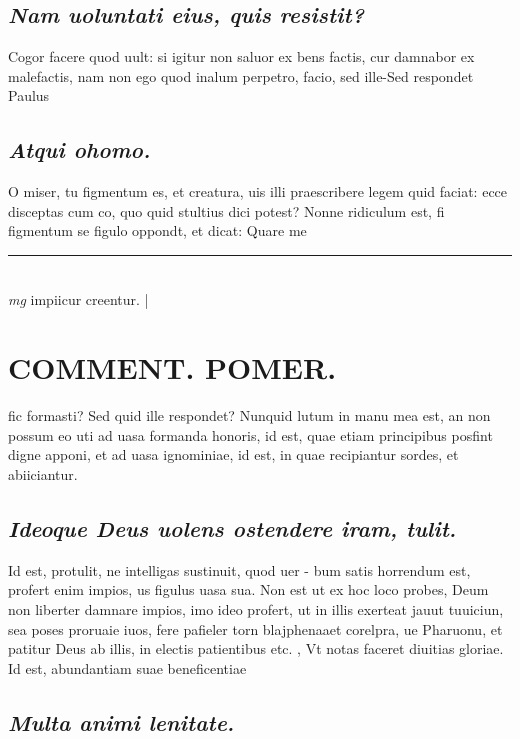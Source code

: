 \documentclass{article}
\begin{document}
\begin{pages}
\subsection*{\textit{Nam uoluntati eius, quis resistit? }}\pstart Cogor facere quod uult: si igitur non saluor ex bens factis, cur damnabor ex malefactis, nam non ego quod inalum perpetro, facio, sed ille-Sed respondet Paulus  \pend
{}
{}
\subsection*{\textit{Atqui ohomo. }}\pstart O miser, tu figmentum es, et creatura, uis illi praescribere legem quid faciat: ecce disceptas cum co, quo quid stultius dici potest? Nonne ridiculum est, fi figmentum se figulo oppondt, et dicat: Quare me  \pend
\vspace{0.5cm}\noindent
\vspace{0.2cm}\rule{1cm}{0.2pt}\\ 
\hspace{0.2cm}\textit{mg}
\footnotesize impiicur creentur.  
\normalsize| 
\section*{COMMENT. POMER.  }\pstart fic formasti? Sed quid ille respondet? Nunquid lutum in manu mea est, an non possum eo uti ad uasa formanda honoris, id est, quae etiam principibus posfint digne apponi, et ad uasa ignominiae, id est, in quae recipiantur sordes, et abiiciantur.  \pend
{}
{}
\subsection*{\textit{Ideoque Deus uolens ostendere iram, tulit. }}\pstart Id est, protulit, ne intelligas sustinuit, quod uer - bum satis horrendum est, profert enim impios, us figulus uasa sua.   \pend\pstart Non est ut ex hoc loco probes, Deum non liberter damnare impios, imo ideo profert, ut in illis exerteat jauut tuuiciun, sea poses proruaie iuos, fere pafieler torn blajphenaaet corelpra, ue Pharuonu, et patitur Deus ab illis, in electis patientibus etc. , Vt notas faceret diuitias gloriae. Id est, abundantiam suae beneficentiae\pend
{}
{}
\subsection*{\textit{Multa animi lenitate. }}
{}

\end{pages}
\end{document}

